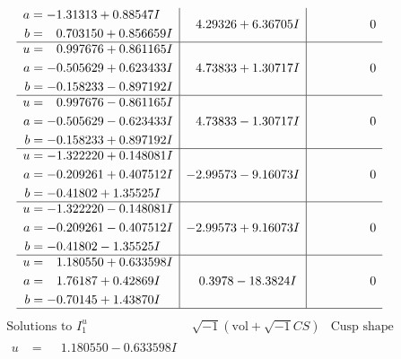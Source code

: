 \documentclass[1p]{elsarticle_modified}
\theoremstyle{definition}
\newcommand{\I}{\sqrt{-1}}
\begin{document}
$$\begin{array}{c|c|c}
\begin{aligned}
a &= -1.31313 + 0.88547 I \\
b &= \phantom{-}0.703150 + 0.856659 I\end{aligned}
 & \phantom{-}4.29326 + 6.36705 I & \phantom{-0.000000 } 0 \\ \hline\begin{aligned}
u &= \phantom{-}0.997676 + 0.861165 I \\
a &= -0.505629 + 0.623433 I \\
b &= -0.158233 - 0.897192 I\end{aligned}
 & \phantom{-}4.73833 + 1.30717 I & \phantom{-0.000000 } 0 \\ \hline\begin{aligned}
u &= \phantom{-}0.997676 - 0.861165 I \\
a &= -0.505629 - 0.623433 I \\
b &= -0.158233 + 0.897192 I\end{aligned}
 & \phantom{-}4.73833 - 1.30717 I & \phantom{-0.000000 } 0 \\ \hline\begin{aligned}
u &= -1.322220 + 0.148081 I \\
a &= -0.209261 + 0.407512 I \\
b &= -0.41802 + 1.35525 I\end{aligned}
 & -2.99573 - 9.16073 I & \phantom{-0.000000 } 0 \\ \hline\begin{aligned}
u &= -1.322220 - 0.148081 I \\
a &= -0.209261 - 0.407512 I \\
b &= -0.41802 - 1.35525 I\end{aligned}
 & -2.99573 + 9.16073 I & \phantom{-0.000000 } 0 \\ \hline\begin{aligned}
u &= \phantom{-}1.180550 + 0.633598 I \\
a &= \phantom{-}1.76187 + 0.42869 I \\
b &= -0.70145 + 1.43870 I\end{aligned}
 & \phantom{-}0.3978 - 18.3824 I & \phantom{-0.000000 } 0\\
 \hline 
 \end{array}$$\newpage$$\begin{array}{c|c|c}  
\text{Solutions to }I^u_{1}& \I (\text{vol} + \sqrt{-1}CS) & \text{Cusp shape}\\
 \hline 
\begin{aligned}
u &= \phantom{-}1.180550 - 0.633598 I \\

\end{aligned}
\end{array}$$
\end{document}
